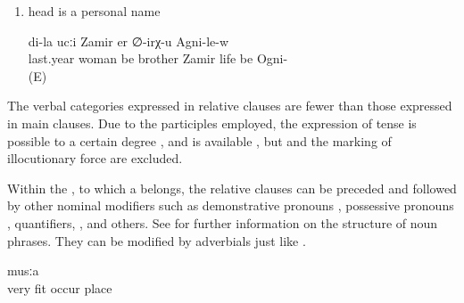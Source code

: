 \begin{enumerate}
	\item	head is a personal name
	\begin{exe}
		\ex	\label{ex:My brother Zamir, who married last year, lives in Ogni}
			di-la	ucːi	Zamir	er	∅-irχ-u	Agni-le-w\\
			last.year	woman	be		brother	Zamir	life	be	Ogni-\\
		\glt	{} (E)
	\end{exe}
\end{enumerate}

The verbal categories expressed in relative clauses are fewer than those expressed in main clauses. Due to the participles employed, the expression of tense is possible to a certain degree ,  and  is available , but  and the marking of illocutionary force are excluded. 

Within the , to which a  belongs, the relative clauses can be preceded and followed by other nominal modifiers such as demonstrative pronouns , possessive pronouns , quantifiers, , and others. See  for further information on the structure of noun phrases. They can be modified by adverbials just like  .

\begin{exe}
	\ex	\label{ex:‎a very fitting (= good) place}
	\gll	[c'aq'-le	b-al	b-ič-ib]	musːa	\\
		very	fit	occur	place\\
	\glt	\sqt{‎a very fitting (= good) place}
\end{exe}

